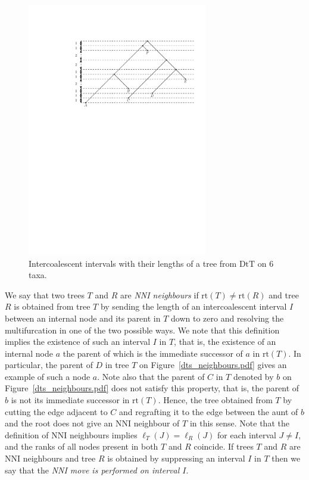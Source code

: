 \documentclass{amsart}
\newcommand{\dts}{\mathrm{DtT}}
\newcommand{\rt}{\mathrm{rt}}
\begin{document}
\begin{figure}
\centering
\includegraphics[width=0.7\textwidth]{T5.pdf}
\caption{Intercoalescent intervals with their lengths of a tree from $\dts$ on $6$ taxa.}
\label{T5.pdf}
\end{figure}

We say that two trees $T$ and $R$ are {\em NNI neighbours} if $\rt(T) \ne \rt(R)$ and tree $R$ is obtained from tree $T$ by sending the length of an intercoalescent interval $I$ between an internal node and its parent in $T$ down to zero and resolving the multifurcation in one of the two possible ways.
We note that this definition implies the existence of such an interval $I$ in $T$, that is, the existence of an internal node $a$ the parent of which is the immediate successor of $a$ in $\rt(T)$.
In particular, the parent of $D$ in tree $T$ on Figure~\ref{dts_neighbours.pdf} gives an example of such a node $a$.
Note also that the parent of $C$ in $T$ denoted by $b$ on Figure~\ref{dts_neighbours.pdf} does not satisfy this property, that is, the parent of $b$ is not its immediate successor in $\rt(T)$.
Hence, the tree obtained from $T$ by cutting the edge adjacent to $C$ and regrafting it to the edge between the aunt of $b$ and the root does not give an NNI neighbour of $T$ in this sense.
Note that the definition of NNI neighbours implies $\ell_T(J) = \ell_R(J)$ for each interval $J \ne I$, and the ranks of all nodes present in both $T$ and $R$ coincide.
If trees $T$ and $R$ are NNI neighbours and tree $R$ is obtained by suppressing an interval $I$ in $T$ then we say that the {\em NNI move is performed on interval $I$}.
\end{document}
